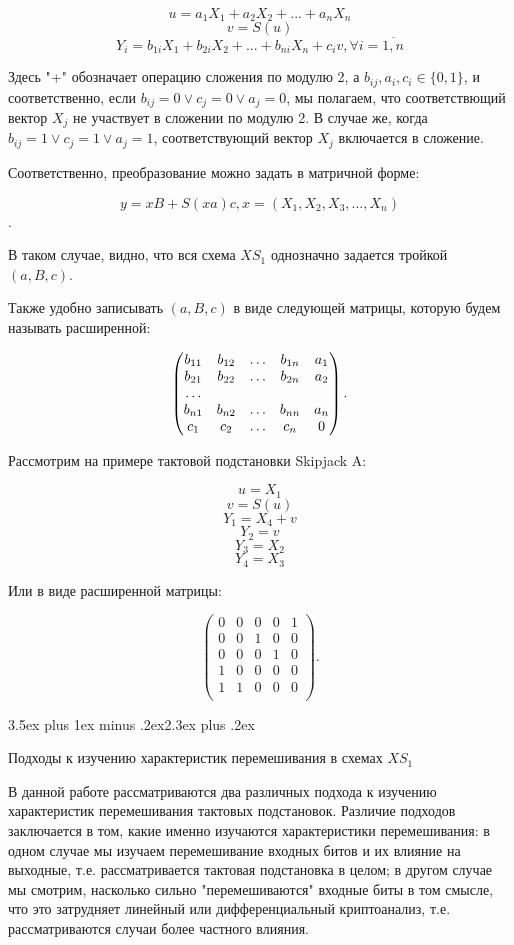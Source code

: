\documentclass[a4paper,12pt]{report}
\makeatletter
\theoremstyle{plain} %
\theoremstyle{definition}
\theoremstyle{remark}
\renewcommand{\section}{\@startsection{section}{1}{18pt}%
{3.5ex plus 1ex minus .2ex}{2.3ex plus .2ex}%
{\normalfont\Large\bfseries\raggedright}}%
\makeatother
\begin{document}
\begin{large}
$$u = a_1X_1 + a_2X_2 + ... + a_nX_n$$
$$v = S(u)$$
$$Y_i = b_{1i}X_1 + b_{2i}X_2 + ... + b_{ni}X_n + c_iv, \forall i = \overline{1,n}$$

Здесь "+" обозначает операцию сложения по модулю 2, а $b_{ij}, a_i, c_i \in \{0, 1\}$, и соответственно, если $b_{ij} = 0 \vee c_j=0 \vee a_j = 0$, мы полагаем, что соответствющий вектор $X_j$ не участвует в сложении по модулю 2. В случае же, когда $b_{ij} = 1 \vee c_j=1 \vee a_j = 1$, соответствующий вектор $X_j$ включается в сложение.

Соответственно, преобразование можно задать в матричной форме:

$$y = xB + S(xa)c, x = (X_1, X_2, X_3, ..., X_n)$$.

В таком случае, видно, что вся схема $XS_1$ однозначно задается тройкой $(a, B, c)$. 

Также удобно записывать $(a, B, c)$ в виде следующей матрицы, которую будем называть расширенной:

$$
\begin{pmatrix}
b_{11} & b_{12} & \ldots & b_{1n} & a_1\\
b_{21} & b_{22} & \ldots & b_{2n} & a_2\\
\dotfill\\
b_{n1} & b_{n2} & \ldots & b_{nn} & a_n\\
c_1    & c_2    & \ldots & c_n    & 0\\
\end{pmatrix}.
$$

Рассмотрим на примере тактовой подстановки Skipjack A:

$$u = X_1$$
$$v = S(u)$$
$$Y_1 = X_4 + v$$
$$Y_2 = v$$
$$Y_3 = X_2$$
$$Y_4 = X_3$$

Или в виде расширенной матрицы:

$$
\begin{pmatrix}
0 & 0 & 0 & 0 & 1\\
0 & 0 & 1 & 0 & 0\\
0 & 0 & 0 & 1 & 0\\
1 & 0 & 0 & 0 & 0\\
1    & 1    & 0 & 0    & 0\\
\end{pmatrix}.
$$

\section{Подходы к изучению характеристик перемешивания в схемах $XS_1$}

В данной работе рассматриваются два различных подхода к изучению характеристик перемешивания тактовых подстановок. Различие подходов заключается в том, какие именно изучаются характеристики перемешивания: в одном случае мы изучаем перемешивание входных битов и их влияние на выходные, т.е. рассматривается тактовая подстановка в целом; в другом случае мы смотрим, насколько сильно "перемешиваются" входные биты в том смысле, что это затрудняет линейный или дифференциальный криптоанализ, т.е. рассматриваются случаи более частного влияния.


\end{large}
\end{document}
